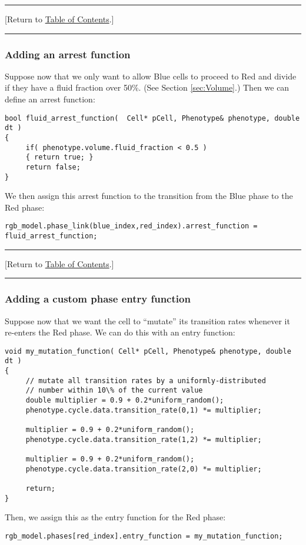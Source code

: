 \documentclass[12pt]{article}
\newcommand{\TOClink}{\begin{center}\hrule\vskip-10pt\phantom{.}\hfill[Return to \hyperlink{TOC}{Table of Contents}.]\hfill\phantom{.}\vskip3pt\hrule\end{center}}
\begin{document}
\TOClink 

\subsubsection{Adding an arrest function}
\label{sec:Examples:arrest}
Suppose now that we only want to allow Blue cells to proceed to Red and divide if 
they have a fluid fraction over 50\%. (See Section \ref{sec:Volume}.) 
Then we can define an arrest function:
\begin{verbatim}
bool fluid_arrest_function(  Cell* pCell, Phenotype& phenotype, double dt )
{
     if( phenotype.volume.fluid_fraction < 0.5 )
     { return true; }
     return false; 
}
\end{verbatim}
We then assign this arrest function to the transition from the Blue phase to the Red phase: 
\begin{verbatim}
rgb_model.phase_link(blue_index,red_index).arrest_function = fluid_arrest_function; 
\end{verbatim}

\TOClink

\subsubsection{Adding a custom phase entry function}
\label{sec:Examples:phase_entry}
Suppose now that we want the cell to ``mutate'' its transition rates whenever it re-enters 
the Red phase. We can do this with an entry function: 
\begin{verbatim}
void my_mutation_function( Cell* pCell, Phenotype& phenotype, double dt )
{
     // mutate all transition rates by a uniformly-distributed 
     // number within 10\% of the current value
     double multiplier = 0.9 + 0.2*uniform_random(); 
     phenotype.cycle.data.transition_rate(0,1) *= multiplier; 

     multiplier = 0.9 + 0.2*uniform_random(); 
     phenotype.cycle.data.transition_rate(1,2) *= multiplier; 

     multiplier = 0.9 + 0.2*uniform_random(); 
     phenotype.cycle.data.transition_rate(2,0) *= multiplier; 

     return; 
}
\end{verbatim}

Then, we assign this as the entry function for the Red phase: 
\begin{verbatim}
rgb_model.phases[red_index].entry_function = my_mutation_function; 
\end{verbatim}
\end{document}
